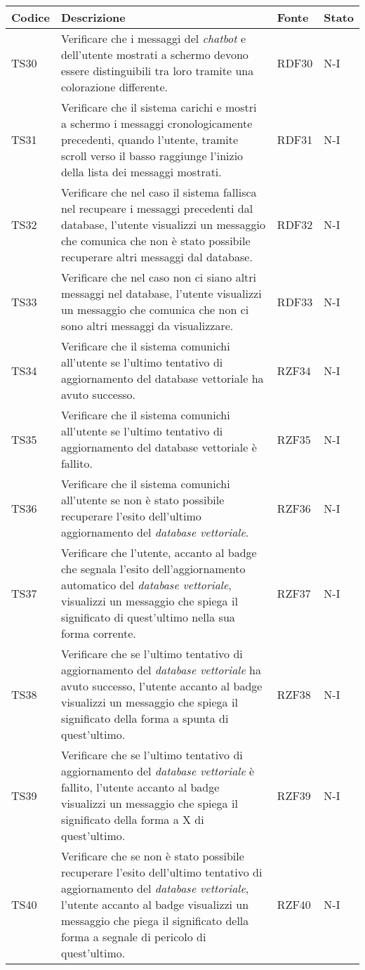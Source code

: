 \begin{table}[h!]
    \centering
    \renewcommand{\arraystretch}{1.5}
    \begin{tabularx}{\textwidth}{|p{}|X|p{}|p{}|}\hline
    \rowcolor[HTML]{FFD700}
    \textbf{Codice} & \textbf{Descrizione} & \textbf{Fonte} & \textbf{Stato} \\ \hline

    TS30 & Verificare che i messaggi del \emph{chatbot} e dell’utente mostrati a schermo devono essere distinguibili tra loro tramite una colorazione differente. & RDF30 & N-I \\ \hline
    TS31 & Verificare che il sistema carichi e mostri a schermo i messaggi cronologicamente precedenti, quando l’utente, tramite scroll verso il basso raggiunge l’inizio della lista dei messaggi mostrati. & RDF31 & N-I \\ \hline
    TS32 & Verificare che nel caso il sistema fallisca nel recupeare i messaggi precedenti dal database, l’utente visualizzi un messaggio che comunica che non è stato possibile recuperare altri messaggi dal database. & RDF32 & N-I \\ \hline
    TS33 & Verificare che nel caso non ci siano altri messaggi nel database, l’utente visualizzi un messaggio che comunica che non ci sono altri messaggi da visualizzare. & RDF33 & N-I \\ \hline
    TS34 & Verificare che il sistema comunichi all’utente se l’ultimo tentativo di aggiornamento del database vettoriale ha avuto successo. & RZF34 & N-I \\ \hline
    TS35 & Verificare che il sistema comunichi all’utente se l’ultimo tentativo di aggiornamento del database vettoriale è fallito. & RZF35 & N-I \\ \hline
    TS36 & Verificare che il sistema comunichi all’utente se non è stato possibile recuperare l’esito dell’ultimo aggiornamento del \emph{database vettoriale}. & RZF36 & N-I \\ \hline
    TS37 & Verificare che l’utente, accanto al badge che segnala l’esito dell’aggiornamento automatico del \emph{database vettoriale}, visualizzi un messaggio che spiega il significato di quest’ultimo nella sua forma corrente. & RZF37 & N-I \\ \hline
    TS38 & Verificare che se l’ultimo tentativo di aggiornamento del \emph{database vettoriale} ha avuto successo, l’utente accanto al badge visualizzi un messaggio che spiega il significato della forma a spunta di quest’ultimo. & RZF38 & N-I \\ \hline
    TS39 & Verificare che se l’ultimo tentativo di aggiornamento del \emph{database vettoriale} è fallito, l’utente accanto al badge visualizzi un messaggio che spiega il significato della forma a X di quest’ultimo. & RZF39 & N-I \\ \hline
    TS40 & Verificare che se non è stato possibile recuperare l’esito dell’ultimo tentativo di aggiornamento del \emph{database vettoriale}, l’utente accanto al badge visualizzi un messaggio che piega il significato della forma a segnale di pericolo di quest’ultimo. & RZF40 & N-I \\ \hline
        

\end{tabularx}
\end{table}
